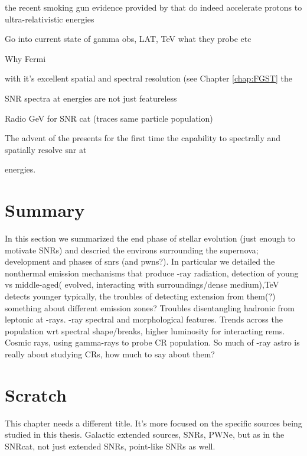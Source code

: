 {the recent smoking gun evidence provided by \FermiLat{} that \snrs{} do indeed accelerate protons to ultra-relativistic energies


Go into current state of gamma obs, LAT, TeV
what they probe etc



Why Fermi

with it's excellent spatial and spectral resolution (see Chapter \ref{chap:FGST} the \lat{}
	
SNR spectra at \gev{} energies are not just featureless \pl{}

Radio GeV for SNR cat (traces same particle population)

The advent of the \lat{} presents for the first time the capability to spectrally and spatially resolve \gls{snr} at \gev} energies.

\section{Summary}\label{Rems:summ} In this section we summarized the end phase of stellar evolution (just enough to motivate SNRs) and descried the environs surrounding the supernova; development and phases of \glspl{snr} (and \glspl{pwn}?).  In particular we detailed the nonthermal emission mechanisms that produce \g-ray radiation, detection of young vs middle-aged( evolved, interacting with surroundings/dense medium),TeV detects younger typically, the troubles of detecting extension from them(?) something about different emission zones? Troubles disentangling hadronic from leptonic at \g-rays. \g-ray spectral and morphological features. Trends across the population wrt spectral shape/breaks, higher luminosity for interacting rems. Cosmic rays, using gamma-rays to probe CR population. So much of \g-ray astro is really about studying CRs, how much to say about them? 

\section{Scratch}
This chapter needs a different title. It's more focused on the specific sources being studied in this thesis. Galactic extended sources, SNRs, PWNe, but as in the SNRcat, not just extended SNRs, point-like SNRs as well.

